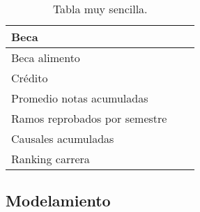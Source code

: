 \begin{table}[H]
\begin{center}
\begin{tabular}{|l|l|l|}
			Beca &  & \\ \hline
			Beca alimento & & \\ \hline
			Crédito &  & \\ \hline
			Promedio notas acumuladas &  & \\ \hline
			Ramos reprobados por semestre & & \\ \hline
			Causales acumuladas & & \\ \hline
			Ranking carrera & & \\ \hline
			
		\end{tabular}
		\caption{Tabla muy sencilla.}
		\label{tabla:sencilla}
	\end{center}
\end{table}


\subsection{Modelamiento}
